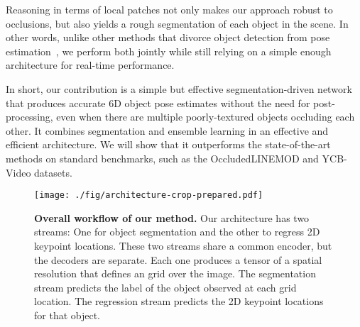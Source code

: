 \documentclass[10pt,twocolumn,letterpaper]{article}
\begin{document}
Reasoning in terms of local patches not only makes our approach robust to occlusions, but also yields a rough segmentation of each object in the scene. In other words, unlike other methods that divorce object detection from pose estimation~\cite{Rad17,Kehl17,Xiang18b}, we perform both jointly while still relying on a simple enough architecture for real-time performance.

In short, our contribution is a simple but effective segmentation-driven network that produces accurate 6D object pose estimates without the need for post-processing, even when there are multiple poorly-textured objects occluding each other. It combines segmentation and ensemble learning in an effective and efficient architecture. We will show that it outperforms the state-of-the-art methods on standard benchmarks, such as the OccludedLINEMOD and YCB-Video datasets.



\begin{figure*}
	\centering
	\texttt{[image: ./fig/architecture-crop-prepared.pdf]}
	\vspace{-3mm}
	\caption{{\bf Overall workflow of our method.} Our architecture has two streams: One for object segmentation and the other to regress 2D keypoint locations. These two streams share a common encoder, but the decoders are separate. Each one produces a tensor of a spatial resolution that defines an  grid over the image. The segmentation stream predicts the label of the object observed at each grid location. The regression stream predicts the 2D keypoint locations for that object. 
}
	\label{fig:architecture}
\end{figure*}
 
 
\end{document}
